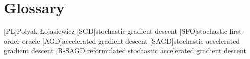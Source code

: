 
\chapter{Glossary}

\begin{acronym}[R-SAGD]
  [PL]{Polyak-Łojasiewicz} 
  [SGD]{stochastic gradient descent}
  [SFO]{stochastic first-order oracle}
  [AGD]{accelerated gradient descent}
  [SAGD]{stochastic accelerated gradient descent}
  [R-SAGD]{reformulated stochastic accelerated gradient descent}
\end{acronym}
